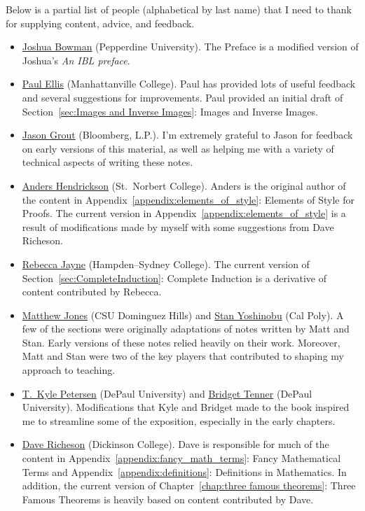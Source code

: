 \documentclass[12pt,oneside]{book}
\theoremstyle{definition}
\begin{document}
\noindent Below is a partial list of people (alphabetical by last name) that I need to thank for supplying content, advice, and feedback.
\begin{itemize}
\item \href{https://thalestriangles.blogspot.com}{Joshua Bowman} (Pepperdine University). The Preface is a modified version of Joshua's \emph{An IBL preface}.
\item \href{http://www.paulellis.org}{Paul Ellis} (Manhattanville College). Paul has provided lots of useful feedback and several suggestions for improvements. Paul provided an initial draft of Section~\ref{sec:Images and Inverse Images}: Images and Inverse Images.
\item \href{http://jasongrout.org}{Jason Grout} (Bloomberg, L.P.).  I'm extremely grateful to Jason for feedback on early versions of this material, as well as helping me with a variety of technical aspects of writing these notes.
\item \href{http://home.snc.edu/andershendrickson/}{Anders Hendrickson} (St.~Norbert College). Anders is the original author of the content in Appendix~\ref{appendix:elements_of_style}: Elements of Style for Proofs. The current version in Appendix~\ref{appendix:elements_of_style} is a result of modifications made by myself with some suggestions from Dave Richeson.
\item \href{http://www.hsc.edu/rebecca-jayne}{Rebecca Jayne} (Hampden--Sydney College). The current version of Section~\ref{sec:CompleteInduction}: Complete Induction is a derivative of content contributed by Rebecca.
\item \href{http://www4.csudh.edu/library/info/civic-directory/f-j/matthew-g-jones}{Matthew Jones} (CSU Dominguez Hills) and \href{http://www.stanyoshinobu.com}{Stan Yoshinobu} (Cal Poly). A few of the sections were originally adaptations of notes written by Matt and Stan. Early versions of these notes relied heavily on their work. Moreover, Matt and Stan were two of the key players that contributed to shaping my approach to teaching.
\item \href{http://math.depaul.edu/tpeter21/}{T.~Kyle Petersen} (DePaul University) and \href{http://math.depaul.edu/bridget/}{Bridget Tenner} (DePaul University). Modifications that Kyle and Bridget made to the book inspired me to streamline some of the exposition, especially in the early chapters.
\item \href{http://users.dickinson.edu/~richesod/}{Dave Richeson} (Dickinson College). Dave is responsible for much of the content in Appendix~\ref{appendix:fancy_math_terms}: Fancy Mathematical Terms and Appendix~\ref{appendix:definitions}: Definitions in Mathematics. In addition, the current version of Chapter~\ref{chap:three famous theorems}: Three Famous Theorems is heavily based on content contributed by Dave.

\end{itemize}
\end{document}
